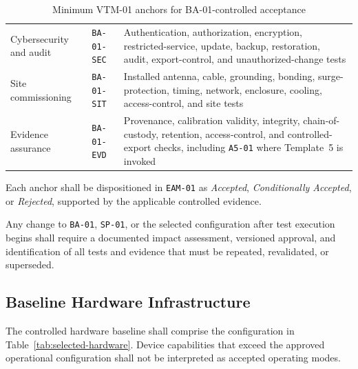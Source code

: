 \documentclass[11pt,a4paper]{article}
\begin{document}
\begin{table}[htbp]
\begin{tabularx}{\columnwidth}{
				>{\raggedright\arraybackslash}p{3.0cm}
				>{\raggedright\arraybackslash}p{2.5cm}
				>{\raggedright\arraybackslash}X}
			Cybersecurity and audit &
			\texttt{BA-01-SEC} &
			Authentication, authorization, encryption, restricted-service,
			update, backup, restoration, audit, export-control, and
			unauthorized-change tests \\
			
			Site commissioning &
			\texttt{BA-01-SIT} &
			Installed antenna, cable, grounding, bonding, surge-protection,
			timing, network, enclosure, cooling, access-control, and site tests \\
			
			Evidence assurance &
			\texttt{BA-01-EVD} &
			Provenance, calibration validity, integrity, chain-of-custody,
			retention, access-control, and controlled-export checks, including
			\texttt{A5-01} where Template~5 is invoked \\
			
			\bottomrule
		\end{tabularx}
		\caption{Minimum VTM-01 anchors for BA-01-controlled acceptance}
		\label{tab:ba01-vtm-anchors}
	\end{table}
	
	Each anchor shall be dispositioned in \texttt{EAM-01} as
	\emph{Accepted}, \emph{Conditionally Accepted}, or \emph{Rejected}, supported
	by the applicable controlled evidence.
	
	Any change to \texttt{BA-01}, \texttt{SP-01}, or the selected configuration
	after test execution begins shall require a documented impact assessment,
	versioned approval, and identification of all tests and evidence that must be
	repeated, revalidated, or superseded.
	
	\subsection*{Baseline Hardware Infrastructure}
	
	The controlled hardware baseline shall comprise the configuration in
	Table~\ref{tab:selected-hardware}. Device capabilities that exceed the approved
	operational configuration shall not be interpreted as accepted operating
	modes.
	
\end{document}
